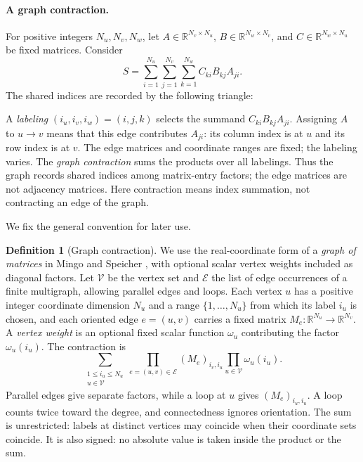 \documentclass[11pt]{article}
\theoremstyle{definition}
\newtheorem{definition}{Definition}[section]
\theoremstyle{remark}
\theoremstyle{plain}
\newcommand{\R}{\mathbb R}
\begin{document}
\paragraph{A graph contraction.}
For positive integers $N_u,N_v,N_w$, let
$A\in\R^{N_v\times N_u}$, $B\in\R^{N_w\times N_v}$, and
$C\in\R^{N_w\times N_u}$ be fixed matrices. Consider
\[
 S=\sum_{i=1}^{N_u}\sum_{j=1}^{N_v}\sum_{k=1}^{N_w}
       C_{ki}B_{kj}A_{ji}.
\]
The shared indices are recorded by the following triangle:
\begin{center}
\end{center}
A \emph{labeling} $(i_u,i_v,i_w)=(i,j,k)$ selects the summand
$C_{ki}B_{kj}A_{ji}$. Assigning $A$ to $u\to v$ means that this
edge contributes $A_{ji}$: its column index is at $u$ and its row
index is at $v$. The edge matrices and coordinate ranges are fixed;
the labeling varies. The \emph{graph contraction} sums the products
over all labelings. Thus the graph records shared indices among
matrix-entry factors; the edge matrices are not adjacency matrices.
Here contraction means index summation, not contracting an edge
of the graph.

We fix the general convention for later use.

\begin{definition}[Graph contraction]\label{def:graph-contraction}
We use the real-coordinate form of a \emph{graph of matrices} in
Mingo and Speicher \cite[Definition~8 and Eq.~(9), pp.~2279--2280]{mingo},
with optional scalar vertex weights included as diagonal factors.
Let $\mathcal V$ be the vertex set
and $\mathcal E$ the list of edge occurrences of a finite multigraph,
allowing parallel edges and loops. Each vertex $u$ has a positive integer
coordinate dimension $N_u$ and a range $\{1,\ldots,N_u\}$ from which
its label $i_u$ is chosen,
and each oriented edge $e=(u,v)$ carries
a fixed matrix $M_e:\R^{N_u}\to\R^{N_v}$. A \emph{vertex weight}
is an optional fixed scalar function $\omega_u$ contributing the
factor $\omega_u(i_u)$. The contraction is
\begin{equation}\label{eq:graph-contraction}
 \sum_{\substack{1\le i_u\le N_u\\u\in\mathcal V}}
       \prod_{e=(u,v)\in\mathcal E}(M_e)_{i_v,i_u}
       \prod_{u\in\mathcal V}\omega_u(i_u).
\end{equation}
Parallel edges give separate factors, while a loop at $u$ gives
$(M_e)_{i_u,i_u}$. A loop counts twice toward the degree, and
connectedness ignores orientation. The sum is unrestricted:
labels at distinct vertices may coincide when their coordinate
sets coincide. It is also signed: no absolute value is taken inside
the product or the sum.
\end{definition}
\end{document}
